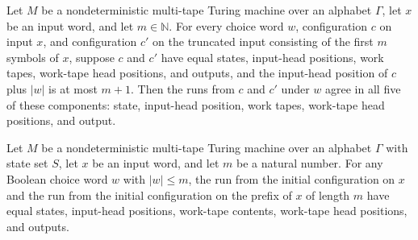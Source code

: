 \begin{lemma}
\label{Turing.NDTM.runWith_take_agree}
\leanok
{}
Let $M$ be a nondeterministic multi-tape Turing machine over an alphabet $\Gamma$, let
$x$ be an input word, and let $m\in\mathbb{N}$. For every choice word $w$, configuration
$c$ on input $x$, and configuration $c'$ on the truncated input consisting of the first
$m$ symbols of $x$, suppose $c$ and $c'$ have equal states, input-head positions, work
tapes, work-tape head positions, and outputs, and the input-head position of $c$ plus
$|w|$ is at most $m+1$. Then the runs from $c$ and $c'$ under $w$ agree in all five of
these components: state, input-head position, work tapes, work-tape head positions, and
output.
\end{lemma}

\begin{theorem}
\label{Turing.NDTM.runWith_initCfg_take}
\leanok
{}
Let $M$ be a nondeterministic multi-tape Turing machine over an alphabet $\Gamma$ with
state set $S$, let $x$ be an input word, and let $m$ be a natural number. For any
Boolean choice word $w$ with $|w|\le m$, the run from the initial configuration on $x$
and the run from the initial configuration on the prefix of $x$ of length $m$ have equal
states, input-head positions, work-tape contents, work-tape head positions, and outputs.
\end{theorem}
